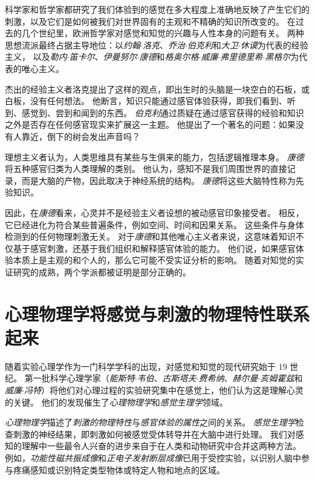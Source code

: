 科学家和哲学家都研究了我们体验到的感觉在多大程度上准确地反映了产生它们的刺激，以及它们是如何被我们对世界固有的主观和不精确的知识所改变的。 
在过去的几个世纪里，欧洲哲学家对感觉和知觉的兴趣与人性本身的问题有关。 
两种思想流派最终占据主导地位：以\textit{约翰$\cdot$洛克}、\textit{乔治$\cdot$伯克利}和\textit{大卫$\cdot$休谟}为代表的经验主义，
以及\textit{勒内$\cdot$笛卡尔}、\textit{伊曼努尔$\cdot$康德}和\textit{格奥尔格$\cdot$威廉$\cdot$弗里德里希$\cdot$黑格尔}为代表的唯心主义。


杰出的经验主义者洛克提出了这样的观点，即出生时的头脑是一块空白的石板，或白板，没有任何想法。
他断言，知识只能通过感官体验获得，即我们看到、听到、感觉到、尝到和闻到的东西。
\textit{伯克利}通过质疑在通过感官获得的经验和知识之外是否存在任何感官现实来扩展这一主题。
他提出了一个著名的问题：如果没有人靠近，倒下的树会发出声音吗？


理想主义者认为，人类思维具有某些与生俱来的能力，包括逻辑推理本身。
\textit{康德}将五种感官归类为人类理解的类别。
他认为，感知不是我们周围世界的直接记录，而是大脑的产物，因此取决于神经系统的结构。
\textit{康德}将这些大脑特性称为先验知识。


因此，在\textit{康德}看来，心灵并不是经验主义者设想的被动感官印象接受者。
相反，它已经进化为符合某些普遍条件，例如空间、时间和因果关系。 
这些条件与身体检测到的任何物理刺激无关。 
对于\textit{康德}和其他唯心主义者来说，这意味着知识不仅基于感官刺激，还基于我们组织和解释感官体验的能力。 
他们说，如果感官体验本质上是主观的和个人的，那么它可能不受实证分析的影响。
随着对知觉的实证研究的成熟，两个学派都被证明是部分正确的。



\section{心理物理学将感觉与刺激的物理特性联系起来}

随着实验心理学作为一门科学学科的出现，对感觉和知觉的现代研究始于 19 世纪。 
第一批科学心理学家（\textit{能斯特$\cdot$韦伯}、\textit{古斯塔夫$\cdot$费希纳}、\textit{赫尔曼$\cdot$亥姆霍兹}和\textit{威廉$\cdot$冯特}）将他们对心理过程的实验研究集中在感觉上，他们认为这是理解心灵的关键。
他们的发现催生了\textit{心理物理学}和\textit{感觉生理学}领域。


\textit{心理物理学}描述了\textit{刺激的物理特性}与\textit{感官体验的属性}之间的关系。 
\textit{感觉生理学}检查刺激的神经结果，即刺激如何被感觉受体转导并在大脑中进行处理。 
我们对感知的理解中一些最令人兴奋的进步来自于在人类和动物研究中合并这两种方法。 
例如，\textit{功能性磁共振成像}和\textit{正电子发射断层成像}已用于受控实验，以识别人脑中参与疼痛感知或识别特定类型物体或特定人物和地点的区域。


